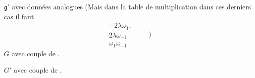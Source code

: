 \diagram{\begin{tikzcd}[row sep=small] {}\arrow[d,leftrightarrow]\\{}\end{tikzcd}}
$\mathfrak g'$ avec données analogues
(Mais dans la table de multiplication
dans ces derniers cas il faut
\[
\begin{array}{r}
-2\lambda\omega_1,\\
2\lambda\omega_{-1}\\
\omega_1\omega_{-1}
\end{array}
\qquad)
\]
\diagram{\begin{tikzcd}[row sep=small] {}\arrow[d,leftrightarrow]\\{}\end{tikzcd}}
$G$ avec couple de .

\diagram{\begin{tikzcd}[row sep=small] {}\arrow[d,leftrightarrow]\\{}\end{tikzcd}}
$G'$ avec couple de .

